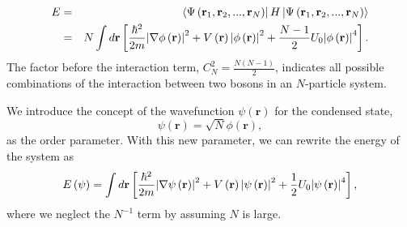 %
\begin{eqnarray}
        E &=& \bra{\Psi\left( \mathbf{r}_1,\mathbf{r}_2,...,\mathbf{r}_N \right)} H \ket{\Psi\left( \mathbf{r}_1,\mathbf{r}_2,...,\mathbf{r}_N \right)} \\ 
        &=& N \int d\mathbf{r} \left[ \frac{\hbar^2}{2m}\abs{\nabla \phi\left(\mathbf{r} \right)}^2 + V \left(\mathbf{r}\right) \abs{\phi\left(\mathbf{r}\right)}^2 + \frac{N-1}{2} U_0 \abs{\phi\left(\mathbf{r}\right)}^4\right]. \nonumber
        \label{eq:Ch1_Exp_Energy}
\end{eqnarray}
%
The factor before the interaction term, $C_N^2 =\frac{N\left(N-1\right)}{2}$, indicates all possible combinations of the interaction between two bosons in an $N$-particle system.

We introduce the concept of the wavefunction $\psi\left(\mathbf{r}\right)$ for the condensed state,
%
\begin{equation}
    \psi\left( \mathbf{r} \right) = \sqrt{N} \phi\left(\mathbf{r}\right),
    \label{eq:Ch1_order_parameter}
\end{equation}
%
as the order parameter.
With this new parameter, we can rewrite the energy of the system as
%
\begin{equation}
    E\left( \psi \right) = \int d\mathbf{r} \left[ \frac{\hbar^2}{2m}\abs{\nabla \psi\left(\mathbf{r} \right)}^2 + V \left(\mathbf{r}\right) \abs{\psi\left(\mathbf{r}\right)}^2 + \frac{1}{2} U_0 \abs{\psi\left(\mathbf{r}\right)}^4\right],
    \label{eq:Ch1_Exp_Energy_order}
\end{equation}
%
where we neglect the $N^{-1}$ term by assuming $N$ is large. 

